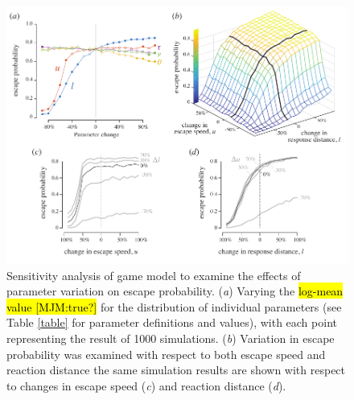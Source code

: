 \documentclass[]{rsos}%
\begin{document}
\begin{figure}[!h]
\centering
	\includegraphics[width=5.5in]{fig_sensitivity}
\caption{Sensitivity analysis of game model to examine the effects of parameter variation on escape probability. 
(\textit{a}) Varying the \hl{log-mean value [MJM:true?]} for the distribution of individual parameters (see Table \ref{table} for parameter definitions and values), with each point representing the result of 1000 simulations. 
(\textit{b}) Variation in escape probability was examined with respect to both escape speed and reaction distance the same simulation results are shown with respect to changes in escape speed (\textit{c}) and reaction distance (\textit{d}).
}
\label{fig_sense}
\end{figure}

\pagebreak
\end{document}
